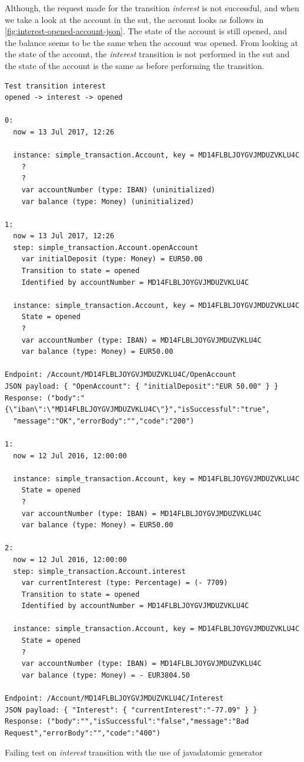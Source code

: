 Although, the request made for the transition \textit{interest} is not
successful, and when we take a look at the account in the \gls{sut}, the account looks
as follows in \autoref{fig:interest-opened-account-json}. The state of the
account is still opened, and the balance seems to be the same when the account
was opened. From looking at the state of the account, the \textit{interest} transition
is not performed in the \gls{sut} and the state of the account is the same as before
performing the transition.


\begin{sourcecode}[h!]
\begin{lstlisting}[]
Test transition interest
opened -> interest -> opened

0:
  now = 13 Jul 2017, 12:26

  instance: simple_transaction.Account, key = MD14FLBLJOYGVJMDUZVKLU4C
    ?
    ?
    var accountNumber (type: IBAN) (uninitialized)
    var balance (type: Money) (uninitialized)

1:
  now = 13 Jul 2017, 12:26
  step: simple_transaction.Account.openAccount
    var initialDeposit (type: Money) = EUR50.00
    Transition to state = opened
    Identified by accountNumber = MD14FLBLJOYGVJMDUZVKLU4C

  instance: simple_transaction.Account, key = MD14FLBLJOYGVJMDUZVKLU4C
    State = opened
    ?
    var accountNumber (type: IBAN) = MD14FLBLJOYGVJMDUZVKLU4C
    var balance (type: Money) = EUR50.00

Endpoint: /Account/MD14FLBLJOYGVJMDUZVKLU4C/OpenAccount
JSON payload: { "OpenAccount": { "initialDeposit":"EUR 50.00" } }
Response: ("body":"{\"iban\":\"MD14FLBLJOYGVJMDUZVKLU4C\"}","isSuccessful":"true",
  "message":"OK","errorBody":"","code":"200")

1:
  now = 12 Jul 2016, 12:00:00

  instance: simple_transaction.Account, key = MD14FLBLJOYGVJMDUZVKLU4C
    State = opened
    ?
    var accountNumber (type: IBAN) = MD14FLBLJOYGVJMDUZVKLU4C
    var balance (type: Money) = EUR50.00

2:
  now = 12 Jul 2016, 12:00:00
  step: simple_transaction.Account.interest
    var currentInterest (type: Percentage) = (- 7709)
    Transition to state = opened
    Identified by accountNumber = MD14FLBLJOYGVJMDUZVKLU4C

  instance: simple_transaction.Account, key = MD14FLBLJOYGVJMDUZVKLU4C
    State = opened
    ?
    var accountNumber (type: IBAN) = MD14FLBLJOYGVJMDUZVKLU4C
    var balance (type: Money) = - EUR3804.50

Endpoint: /Account/MD14FLBLJOYGVJMDUZVKLU4C/Interest
JSON payload: { "Interest": { "currentInterest":"-77.09" } }
Response: ("body":"","isSuccessful":"false","message":"Bad Request","errorBody":"","code":"400")
\end{lstlisting}
\caption{Failing test on \textit{interest} transition with the use of javadatomic generator}\label{fig:result-javadatomic-interest}
\end{sourcecode}
\FloatBarrier

